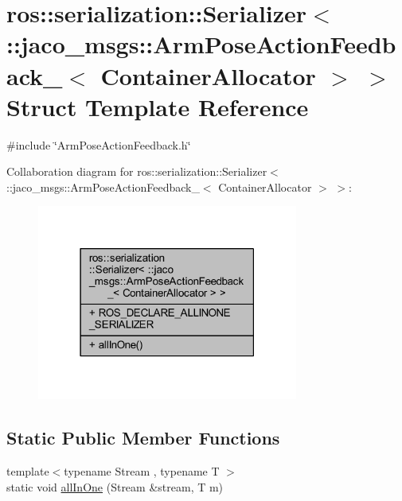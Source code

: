 \hypertarget{structros_1_1serialization_1_1Serializer_3_01_1_1jaco__msgs_1_1ArmPoseActionFeedback___3_01ContainerAllocator_01_4_01_4}{}\section{ros\+:\+:serialization\+:\+:Serializer$<$ \+:\+:jaco\+\_\+msgs\+:\+:Arm\+Pose\+Action\+Feedback\+\_\+$<$ Container\+Allocator $>$ $>$ Struct Template Reference}
\label{structros_1_1serialization_1_1Serializer_3_01_1_1jaco__msgs_1_1ArmPoseActionFeedback___3_01ContainerAllocator_01_4_01_4}


{\ttfamily \#include \char`\"{}Arm\+Pose\+Action\+Feedback.\+h\char`\"{}}



Collaboration diagram for ros\+:\+:serialization\+:\+:Serializer$<$ \+:\+:jaco\+\_\+msgs\+:\+:Arm\+Pose\+Action\+Feedback\+\_\+$<$ Container\+Allocator $>$ $>$\+:
\nopagebreak
\begin{figure}[H]
\begin{center}
\leavevmode
\includegraphics[width=243pt]{d3/df4/structros_1_1serialization_1_1Serializer_3_01_1_1jaco__msgs_1_1ArmPoseActionFeedback___3_01Contaa77e92e82e5fc5fc8dc282a532c9905b}
\end{center}
\end{figure}
\subsection*{Static Public Member Functions}
\begin{DoxyCompactItemize}
\item 
{\footnotesize template$<$typename Stream , typename T $>$ }\\static void \hyperlink{structros_1_1serialization_1_1Serializer_3_01_1_1jaco__msgs_1_1ArmPoseActionFeedback___3_01ContainerAllocator_01_4_01_4_ab7190603827d61cc3292cfd829b637d5}{all\+In\+One} (Stream \&stream, T m)
\end{DoxyCompactItemize}
